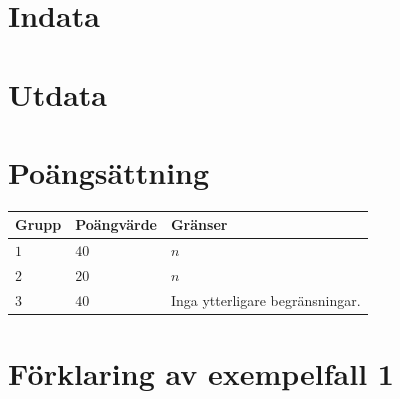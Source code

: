 
\section*{Indata}

\section*{Utdata}

\section*{Poängsättning}

\noindent
\begin{tabular}{| l | l | l |}
\hline
Grupp & Poängvärde & Gränser \\ \hline
$1$   & $40$       & $n$ \\ \hline
$2$   & $20$       & $n$ \\ \hline
$3$   & $40$       & Inga ytterligare begränsningar. \\ \hline
\end{tabular}

\section*{Förklaring av exempelfall 1}
